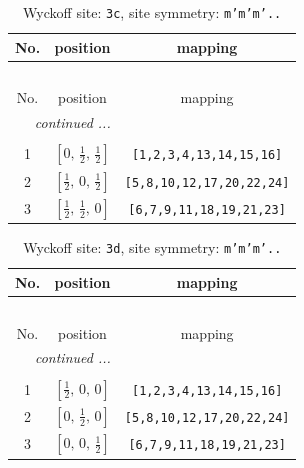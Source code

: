\documentclass[fleqn,8pt]{jsarticle}
\begin{document}
\begin{longtable}{ccc}
\caption{Wyckoff site: {\tt 3c}, site symmetry: {\tt m'm'm'..}}
 \\
 \hline \hline
No. & position & mapping \\ \hline \endfirsthead

\multicolumn{2}{l}{\tablename\ \thetable{}} \\
 \hline \hline
No. & position & mapping \\ \hline \endhead

 \hline \hline
\multicolumn{2}{r}{\footnotesize\it continued ...} \\ \endfoot

 \hline \hline
\multicolumn{2}{r}{} \\ \endlastfoot

1 & $\left[ 0,\, \frac{1}{2},\, \frac{1}{2} \right]$ & {\tt [1,2,3,4,13,14,15,16]} \\ \hline
2 & $\left[ \frac{1}{2},\, 0,\, \frac{1}{2} \right]$ & {\tt [5,8,10,12,17,20,22,24]} \\ \hline
3 & $\left[ \frac{1}{2},\, \frac{1}{2},\, 0 \right]$ & {\tt [6,7,9,11,18,19,21,23]} \\
\end{longtable}
\renewcommand{\arraystretch}{1.2}
\begin{longtable}{ccc}
\caption{Wyckoff site: {\tt 3d}, site symmetry: {\tt m'm'm'..}}
 \\
 \hline \hline
No. & position & mapping \\ \hline \endfirsthead

\multicolumn{2}{l}{\tablename\ \thetable{}} \\
 \hline \hline
No. & position & mapping \\ \hline \endhead

 \hline \hline
\multicolumn{2}{r}{\footnotesize\it continued ...} \\ \endfoot

 \hline \hline
\multicolumn{2}{r}{} \\ \endlastfoot

1 & $\left[ \frac{1}{2},\, 0,\, 0 \right]$ & {\tt [1,2,3,4,13,14,15,16]} \\ \hline
2 & $\left[ 0,\, \frac{1}{2},\, 0 \right]$ & {\tt [5,8,10,12,17,20,22,24]} \\ \hline
3 & $\left[ 0,\, 0,\, \frac{1}{2} \right]$ & {\tt [6,7,9,11,18,19,21,23]} \\
\end{longtable}
\renewcommand{\arraystretch}{1.2}
\end{document}
